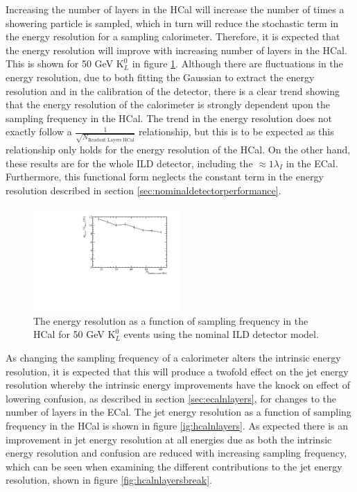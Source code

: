 Increasing the number of layers in the HCal will increase the number of times a showering particle is sampled, which in turn will reduce the stochastic term in the energy resolution for a sampling calorimeter.  Therefore, it is expected that the energy resolution will improve with increasing number of layers in the HCal.  This is shown for 50 GeV $\text{K}^{0}_{L}$ in figure \ref{fig:hcalnlayerser}.  Although there are fluctuations in the energy resolution, due to both fitting the Gaussian to extract the energy resolution and in the calibration of the detector, there is a clear trend showing that the energy resolution of the calorimeter is strongly dependent upon the sampling frequency in the HCal.   The trend in the energy resolution does not exactly follow a $\frac{1}{\sqrt{N_{\text{Readout Layers HCal}}}}$ relationship, but this is to be expected as this relationship only holds for the energy resolution of the HCal.  On the other hand, these results are for the whole ILD detector, including the $\approx 1 \lambda_{I}$ in the ECal.  Furthermore, this functional form neglects the constant term in the energy resolution described in section \ref{sec:nominaldetectorperformance}.  

\begin{figure}[h!]
\centering
\includegraphics[width=0.5\textwidth]{OptimisationStudies/Plots/EnergyResolution/ER_vs_NHCalVariableLayers_50GeVKaon0L.pdf}
\caption[The energy resolution as a function of sampling frequency in the HCal for 50 GeV $\text{K}^{0}_{L}$ events using the nominal ILD detector model.]{The energy resolution as a function of sampling frequency in the HCal for 50 GeV $\text{K}^{0}_{L}$ events using the nominal ILD detector model.}
\label{fig:hcalnlayerser}
\end{figure}

As changing the sampling frequency of a calorimeter alters the intrinsic energy resolution, it is expected that this will produce a twofold effect on the jet energy resolution whereby the intrinsic energy improvements have the knock on effect of lowering confusion, as described in section \ref{sec:ecalnlayers}, for changes to the number of layers in the ECal.  The jet energy resolution as a function of sampling frequency in the HCal is shown in figure \ref{ig:hcalnlayers}.  As expected there is an improvement in jet energy resolution at all energies due as both the intrinsic energy resolution and confusion are reduced with increasing sampling frequency, which can be seen when examining the different contributions to the jet energy resolution, shown in figure \ref{fig:hcalnlayersbreak}.  

